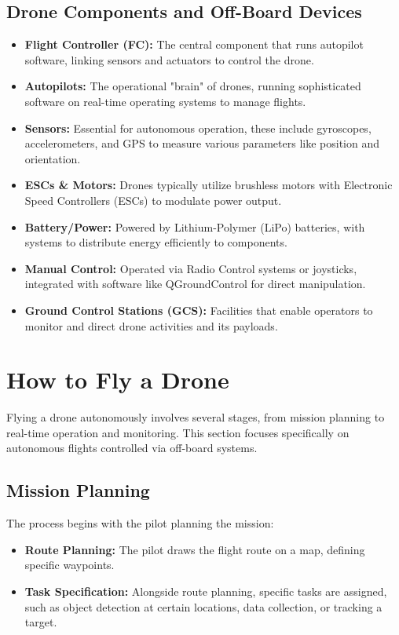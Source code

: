 \subsection{Drone Components and Off-Board Devices}
\begin{itemize}
    \item \textbf{Flight Controller (FC):} The central component that runs autopilot software, linking sensors and actuators to control the drone.
    \item \textbf{Autopilots:} The operational "brain" of drones, running sophisticated software on real-time operating systems to manage flights.
    \item \textbf{Sensors:} Essential for autonomous operation, these include gyroscopes, accelerometers, and GPS to measure various parameters like position and orientation.
    \item \textbf{ESCs \& Motors:} Drones typically utilize brushless motors with Electronic Speed Controllers (ESCs) to modulate power output.
    \item \textbf{Battery/Power:} Powered by Lithium-Polymer (LiPo) batteries, with systems to distribute energy efficiently to components.
    \item \textbf{Manual Control:} Operated via Radio Control systems or joysticks, integrated with software like QGroundControl\cite{qgroundcontrol2023} for direct manipulation.
    \item \textbf{Ground Control Stations (GCS):} Facilities that enable operators to monitor and direct drone activities and its payloads.
\end{itemize}

\section{How to Fly a Drone}

Flying a drone autonomously involves several stages, from mission planning to real-time operation and monitoring. This section focuses specifically on autonomous flights controlled via off-board systems.

\subsection{Mission Planning}
The process begins with the pilot planning the mission:
\begin{itemize}
    \item \textbf{Route Planning:} The pilot draws the flight route on a map, defining specific waypoints.
    \item \textbf{Task Specification:} Alongside route planning, specific tasks are assigned, such as object detection at certain locations, data collection, or tracking a target.
\end{itemize}

